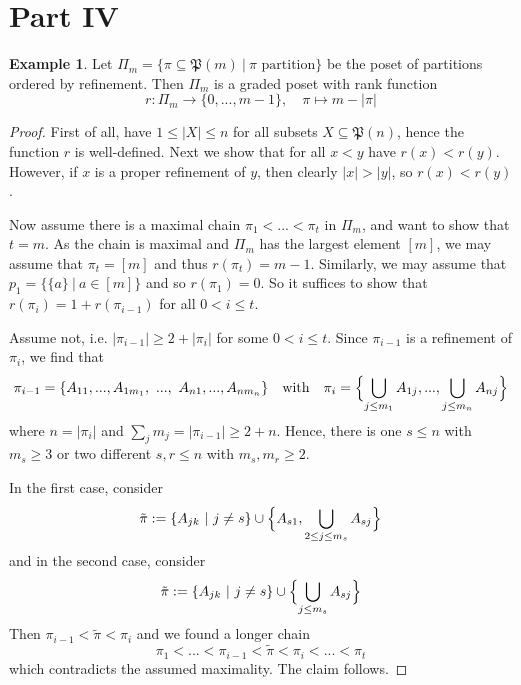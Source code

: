 \documentclass{scrartcl}
\newcommand{\powerset}{\mathfrak{P}}
\theoremstyle{definition}
\newtheorem{example}[definition]{Example}
\begin{document}
\section{Part IV}
\begin{example}
    Let $\Pi_m = \{ \pi \subseteq \powerset(m) \ | \ \text{$\pi$ partition} \}$ be the poset of partitions ordered by refinement.
    Then $\Pi_m$ is a graded poset with rank function
    \begin{equation*}
        r: \Pi_m \to \{ 0, ..., m - 1 \}, \quad \pi \mapsto m - |\pi|
    \end{equation*}
\end{example}
\begin{proof}
    First of all, have $1 \leq |X| \leq n$ for all subsets $X \subseteq \powerset(n)$, hence the function $r$ is well-defined.
    Next we show that for all $x < y$ have $r(x) < r(y)$.
    However, if $x$ is a proper refinement of $y$, then clearly $|x| > |y|$, so $r(x) < r(y)$.

    Now assume there is a maximal chain $\pi_1 < ... < \pi_t$ in $\Pi_m$, and want to show that $t = m$.
    As the chain is maximal and $\Pi_m$ has the largest element $[m]$, we may assume that $\pi_t = [m]$ and thus $r(\pi_t) = m - 1$.
    Similarly, we may assume that $p_1 = \{ \{a\} \ | \ a \in [m]\}$ and so $r(\pi_1) = 0$.
    So it suffices to show that $r(\pi_i) = 1 + r(\pi_{i - 1})$ for all $0 < i \leq t$.

    Assume not, i.e. $|\pi_{i - 1}| \geq 2 + |\pi_i|$ for some $0 < i \leq t$.
    Since $\pi_{i - 1}$ is a refinement of $\pi_i$, we find that
    \begin{equation*}
        \pi_{i - 1} = \{ A_{11}, ..., A_{1m_1}, \ ..., \ A_{n1}, ..., A_{nm_n} \} \quad \text{with} \quad \pi_i = \Bigl\{ \bigcup_{j \leq m_1} A_{1j}, ..., \bigcup_{j \leq m_n} A_{nj} \Bigr\}
    \end{equation*}
    where $n = |\pi_i|$ and $\sum_j m_j = |\pi_{i - 1}| \geq 2 + n$.
    Hence, there is one $s \leq n$ with $m_s \geq 3$ or two different $s, r \leq n$ with $m_s, m_r \geq 2$.
    
    In the first case, consider
    \begin{equation*}
        \tilde{\pi} := \{ A_{jk} \ | \ j \neq s \} \cup \Bigl\{ A_{s1}, \bigcup_{2 \leq j \leq m_s} A_{sj} \Bigr\}
    \end{equation*}
    and in the second case, consider
    \begin{equation*}
        \tilde{\pi} := \{ A_{jk} \ | \ j \neq s \} \cup \Bigl\{ \bigcup_{j \leq m_s} A_{sj} \Bigr\}
    \end{equation*}
    Then $\pi_{i - 1} < \tilde{\pi} < \pi_i$ and we found a longer chain
    \begin{equation*}
        \pi_1 < ... < \pi_{i - 1} < \tilde{\pi} < \pi_i < ... < \pi_t
    \end{equation*}
    which contradicts the assumed maximality. The claim follows.
\end{proof}
\end{document}
